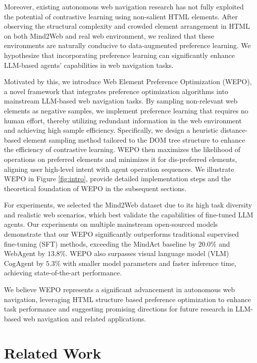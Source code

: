\documentclass{article}
\begin{document}
  Moreover, existing autonomous web navigation research has not fully exploited the potential of contrastive learning using non-salient HTML elements. After observing the structural complexity and crowded element arrangement in HTML on both Mind2Web and real web environment, we realized that these environments are naturally conducive to data-augmented preference learning. We hypothesize that incorporating preference learning can significantly enhance LLM-based agents' capabilities in web navigation tasks. 
  
  Motivated by this, we introduce Web Element Preference Optimization (WEPO), a novel framework that integrates preference optimization algorithms into mainstream LLM-based web navigation tasks. By sampling non-relevant web elements as negative samples, we implement preference learning that requires no human effort, thereby utilizing redundant information in the web environment and achieving high sample efficiency. Specifically, we design a heuristic distance-based element sampling method tailored to the DOM tree structure to enhance the efficiency of contrastive learning. WEPO then maximizes the likelihood of operations on preferred elements and minimizes it for dis-preferred elements, aligning user high-level intent with agent operation sequences. We illustrate WEPO in Figure \ref{fig:intro}, provide detailed implementation steps and the theoretical foundation of WEPO in the subsequent sections.
  
  For experiments, we selected the Mind2Web dataset due to its high task diversity and realistic web scenarios, which best validate the capabilities of fine-tuned LLM agents. Our experiments on multiple mainstream open-sourced models demonstrate that our WEPO significantly outperforms traditional supervised fine-tuning (SFT) methods, exceeding the MindAct \citep{deng2024mind2web} baseline by $20.0\%$ and WebAgent \citep{gur2023real} by $13.8\%$. WEPO also surpasses visual language model (VLM) CogAgent \citep{hong2023cogagent} by $5.3\%$ with smaller model parameters and faster inference time, achieving state-of-the-art performance.
  
  We believe WEPO represents a significant advancement in autonomous web navigation, leveraging HTML structure based preference optimization to enhance task performance and suggesting promising directions for future research in LLM-based web navigation and related applications.


\section{Related Work}
\end{document}
